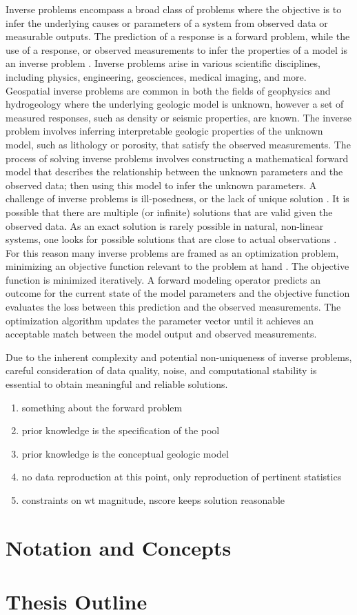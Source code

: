 Inverse problems encompass a broad class of problems where the objective is to infer the underlying causes or parameters of a system from observed data or measurable outputs. The prediction of a response is a forward problem, while the use of a response, or observed measurements to infer the properties of a model is an inverse problem \citep{tarantola2005inverse}. Inverse problems arise in various scientific disciplines, including physics, engineering, geosciences, medical imaging, and more. Geospatial inverse problems are common in both the fields of geophysics \citep{linde2015geological} and hydrogeology \citep{zhou2014inverse} where the underlying geologic model is unknown, however a set of measured responses, such as density or seismic properties, are known. The inverse problem involves inferring interpretable geologic properties of the unknown model, such as lithology or porosity, that satisfy the observed measurements. The process of solving inverse problems involves constructing a mathematical forward model that describes the relationship between the unknown parameters and the observed data; then using this model to infer the unknown parameters. A challenge of inverse problems is ill-posedness, or the lack of unique solution \citep{tarantola2005inverse}. It is possible that there are multiple (or infinite) solutions that are valid given the observed data. As an exact solution is rarely possible in natural, non-linear systems, one looks for possible solutions that are close to actual observations \citep{bardossy2016random}. For this reason many inverse problems are framed as an optimization problem, minimizing an objective function relevant to the problem at hand \citep{giraud2019integration,nava-flores2023high,athens2022stochastic}. The objective function is minimized iteratively. A forward modeling operator predicts an outcome for the current state of the model parameters and the objective function evaluates the loss between this prediction and the observed measurements. The optimization algorithm updates the parameter vector until it achieves an acceptable match between the model output and observed measurements.

Due to the inherent complexity and potential non-uniqueness of inverse problems, careful consideration of data quality, noise, and computational stability is essential to obtain meaningful and reliable solutions.

\begin{enumerate}
    \item something about the forward problem
    \item prior knowledge is the specification of the pool
    \item prior knowledge is the conceptual geologic model
    \item no data reproduction at this point, only reproduction of pertinent statistics
    \item constraints on wt magnitude, nscore keeps solution reasonable
\end{enumerate}

\FloatBarrier
\section{Notation and Concepts}
\label{sec:01notation}

\FloatBarrier
\section{Thesis Outline}
\label{sec:01outline}